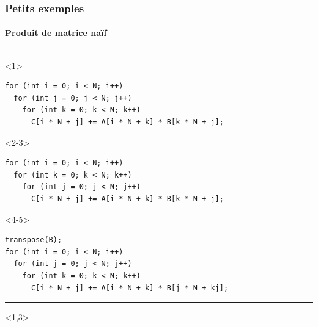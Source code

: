 \documentclass[xcolor={x11names,svgnames}, 14pt]{beamer}
\begin{document}


\begin{frame}[label=applications,fragile]
\frametitle{Petits exemples}
\framesubtitle{Produit de matrice naïf}

\hrule%
\begin{overlayarea}{\textwidth}{2.5cm}%
\begin{onlyenv}<1>%
\begin{verbatim}
for (int i = 0; i < N; i++)
  for (int j = 0; j < N; j++)
    for (int k = 0; k < N; k++)
      C[i * N + j] += A[i * N + k] * B[k * N + j];
\end{verbatim}
\end{onlyenv}%
\begin{onlyenv}<2-3>%
\vspace{-0.45cm}
\begin{verbatim}
for (int i = 0; i < N; i++)
  for (int k = 0; k < N; k++)
    for (int j = 0; j < N; j++)
      C[i * N + j] += A[i * N + k] * B[k * N + j];
\end{verbatim}
  \vfill
\end{onlyenv}%
\begin{onlyenv}<4-5>%
  \vspace{-0.45cm}
\begin{verbatim}
transpose(B);
for (int i = 0; i < N; i++)
  for (int j = 0; j < N; j++)
    for (int k = 0; k < N; k++)
      C[i * N + j] += A[i * N + k] * B[j * N + kj];
\end{verbatim}
\end{onlyenv}%

\end{overlayarea}

\hrule

\begin{overlayarea}{\textwidth}{4cm}

  \begin{onlyenv}<1,3>
\end{onlyenv}
\end{overlayarea}
\end{frame}
\end{document}
